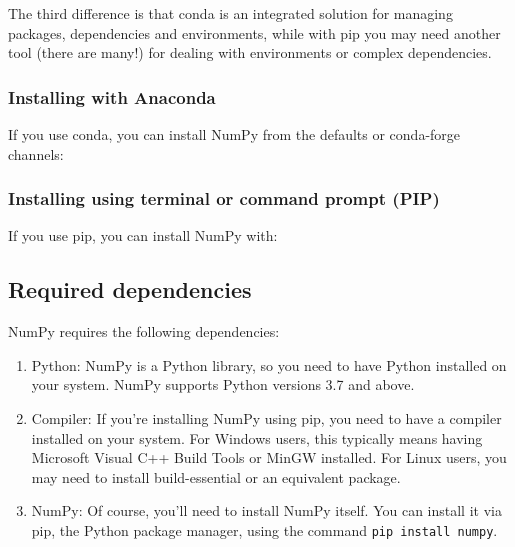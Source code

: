 \bigskip

The third difference is that conda is an integrated solution for managing
packages, dependencies and environments, while with pip you may need another
tool (there are many!) for dealing with environments or complex dependencies.

\subsubsection{Installing with Anaconda}

If you use conda, you can install NumPy from the defaults or conda-forge channels:

\begin{code}
	[H] 
	\caption{Installing NumPy using terminal}
\end{code}

\subsubsection{Installing using terminal or command prompt (PIP)}

If you use pip, you can install NumPy with:

\begin{code}
	[H] 
	\caption{Installing NumPy using PIP}
\end{code}

\subsection{Required dependencies}

NumPy requires the following dependencies:

\begin{enumerate}
	\item Python: NumPy is a Python library, so you need to have Python installed on
	your system. NumPy supports Python versions 3.7 and above.
	
	\item Compiler: If you're installing NumPy using pip, you need to have a compiler
	installed on your system. For Windows users, this typically means having Microsoft
	Visual C++ Build Tools or MinGW installed. For Linux users, you may need to install
	build-essential or an equivalent package.
	
	\item NumPy: Of course, you'll need to install NumPy itself. You can install
	it via pip, the Python package manager, using the command \texttt{pip
		install numpy}.
\end{enumerate}

